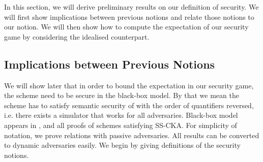 In this section, we will derive preliminary results on our definition of security. We will first show implications between previous notions and relate those notions to our notion. We will then show how to compute the expectation of our security game by considering the idealised counterpart.


\subsection{Implications between Previous Notions}
We will show later that in order to bound the expectation in our security game, the scheme need to be secure in the black-box model. By that we mean the scheme has to satisfy semantic security of \cite{CCS:CGKO06} with the order of quantifiers reversed, i.e. there exists a simulator that works for all adversaries. Black-box model appears in \cite{FC:KurOht12}, and all proofs of schemes satisfying SS-CKA. For simplicity of notation, we prove relations with passive adversaries. All results can be converted to dynamic adversaries easily. We begin by giving definitions of the security notions.


